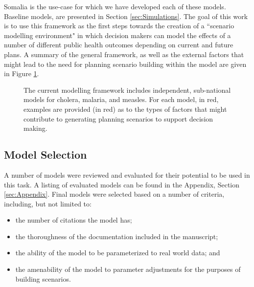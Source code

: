 \documentclass[letter,12pt, usenames,dvipsnames]{article}
\begin{document}
Somalia is the use-case for which we have developed each of these models.  Baseline models, are presented in Section \ref{sec:Simulations}.  The goal of this work is to use this framework as the first steps towards the creation of a ``scenario modelling environment" in which decision makers can model the effects of a number of different public health outcomes depending on current and future plans. A summary of the general framework, as well as the external factors that might lead to the need for planning scenario building within the model are given in Figure \ref{fig:basicFramework}. 
\begin{figure}[h!]
\centering
{}

\caption{The current modelling framework includes independent, sub-national models for cholera, malaria, and measles.  For each model, in red, examples are provided (in red) as to the types of factors that might contribute to generating planning scenarios to support decision making.}

\label{fig:basicFramework}
\end{figure}

\subsection{Model Selection}
A number of models were reviewed and evaluated for their potential to be used in this task.  A listing of evaluated models can be found in the Appendix, Section \ref{sec:Appendix}. Final models were selected based on a number of criteria, including, but not limited to: 

\begin{itemize}
    \item the number of citations the model has;
    \item the thoroughness of the documentation included in the manuscript;
    \item the ability of the model to be parameterized to real world data; and
    \item the amenability of the model to parameter adjustments for the purposes of building scenarios.
\end{itemize}
\end{document}

